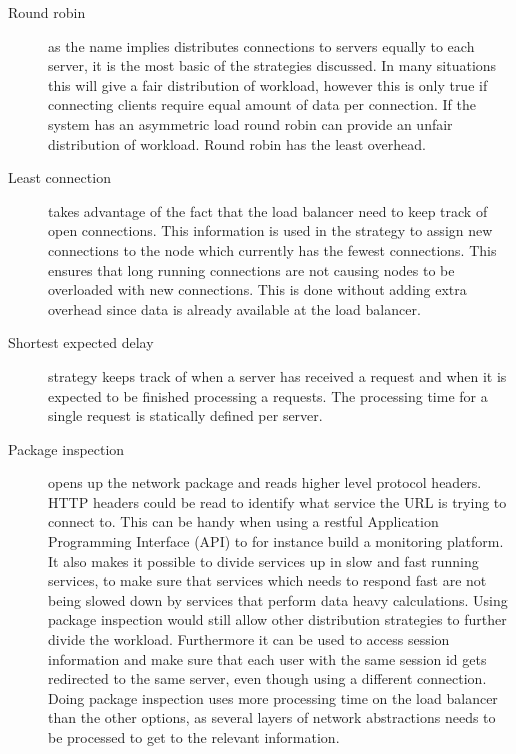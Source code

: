 \begin{description}
	\item[Round robin] as the name implies distributes connections to servers equally to each server, it is the most basic of the strategies discussed. In many situations this will give a fair distribution of workload, however this is only true if connecting clients require equal amount of data per connection. If the system has an asymmetric load round robin can provide an unfair distribution of workload. 
	Round robin has the least overhead.
	
	\item[Least connection] takes advantage of the fact that the load balancer need to keep track of open connections. This information is used in the strategy to assign new connections to the node which currently has the fewest connections.
	This ensures that long running connections are not causing nodes to be overloaded with new connections.
	This is done without adding extra overhead since data is already available at the load balancer.
	
	\item[Shortest expected delay] strategy keeps track of when a server has received a request and when it is expected to be finished processing a requests. The processing time for a single request is statically defined per server.
	
	
	\item[Package inspection] opens up the network package and reads higher level protocol headers. HTTP headers could be read to identify what service the URL is trying to connect to. This can be handy when using a restful Application Programming Interface (API) to for instance build a monitoring platform.
	It also makes it possible to divide services up in slow and fast running services, to make sure that services which needs to respond fast are not being slowed down by services that perform data heavy calculations.
	Using package inspection would still allow other distribution strategies to further divide the workload.
	Furthermore it can be used to access session information and make sure that each user with the same session id gets redirected to the same server, even though using a different connection.
	Doing package inspection uses more processing time on the load balancer than the other options, as several layers of network abstractions needs to be processed to get to the relevant information. %
	
\end{description}
